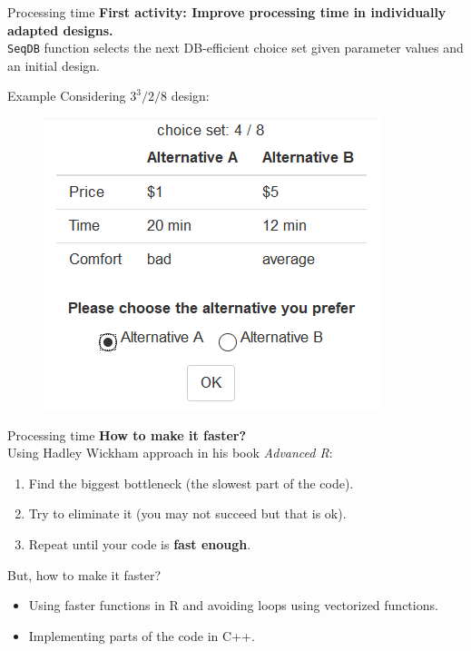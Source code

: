 \documentclass[11pt,t]{beamer}
\begin{document}
\begin{frame}[fragile]{Processing time}
\textbf{First activity: Improve processing time in individually adapted designs.}\\
	\texttt{SeqDB} function selects the next DB-efficient choice set given parameter values and an initial design.
	
	\begin{exampleblock}{Example}
		Considering $3^3/2/8$ design:
		\begin{figure}
			\centering
			\includegraphics[scale = .5]{mygraphics/choiceset.png}
		\end{figure}
	\end{exampleblock}
\end{frame}

\begin{frame}[fragile]{Processing time}
	\textbf{How to make it faster?}\\
	Using Hadley Wickham approach in his book \textit{Advanced R}:
	\begin{enumerate}
		\item Find the biggest bottleneck (the slowest part of the code).
		\item Try to eliminate it (you may not succeed but that is ok).
		\item Repeat until your code is \textbf{fast enough}.
	\end{enumerate}
	\pause
	\begin{block}{But, how to make it faster?}
	\begin{itemize}
		\item Using faster functions in R and avoiding loops using vectorized functions.
		\item Implementing parts of the code in C++.
	\end{itemize}		
	\end{block}
\end{frame}
\end{document}
